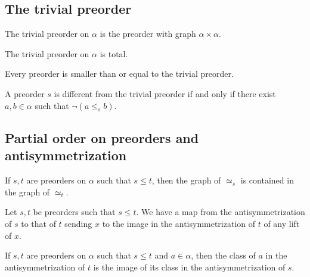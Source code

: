 \subsection{The trivial preorder}

\begin{subdefi}[trivialPreorder]
The trivial preorder on $\alpha$ is the preorder with graph $\alpha\times\alpha$.

\end{subdefi}

\begin{subdefi}
The trivial preorder on $\alpha$ is total.

\end{subdefi}

\begin{sublemma}
Every preorder is smaller than or equal to the trivial preorder.

\end{sublemma}

\begin{sublemma}
A preorder $s$ is different from the trivial preorder if and only if there exist $a,b\in\alpha$ such that $\neg(a \le_s b)$.

\end{sublemma}

\subsection{Partial order on preorders and antisymmetrization}

\begin{sublemma}
If $s,t$ are preorders on $\alpha$ such that $s \le t$, then the graph of $\simeq_s$ is contained in the graph of $\simeq_t$.

\end{sublemma}

\begin{subdefi}[AntisymmetrizationtoAntisymmetrization]
Let $s,t$ be preorders such that $s\le t$. We have a map from the antisymmetrization of $s$ to that of $t$ sending $x$ to the image 
in the antisymmetrization of $t$ of any lift of $x$.

\end{subdefi}

\begin{sublemma}
If $s,t$ are preorders on $\alpha$ such that $s \le t$ and $a\in\alpha$, then the class of $a$ in the antisymmetrization of $t$ is the
image of its class in the antisymmetrization of $s$.

\end{sublemma}


